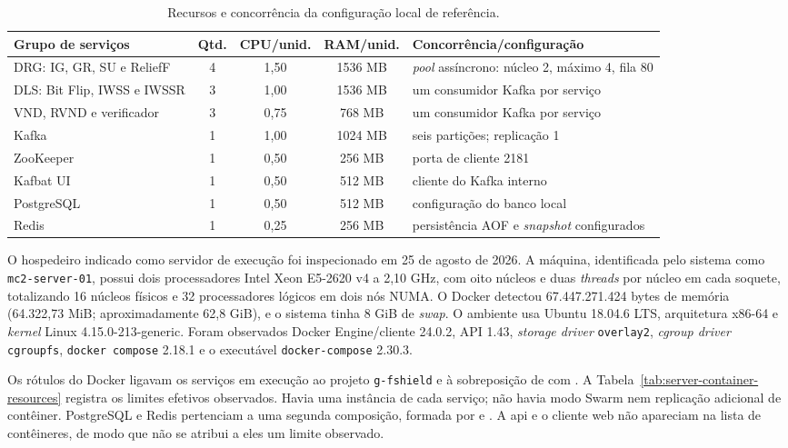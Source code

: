 \begin{table}[!htb]
  \centering
  \scriptsize
  \caption{Recursos e concorrência da configuração local de referência.}
  \label{tab:container-resources}
  \begin{tabularx}{\linewidth}{@{}Xc c c X@{}}
    \toprule
    \textbf{Grupo de serviços} & \textbf{Qtd.} & \textbf{CPU/unid.} & \textbf{RAM/unid.} & \textbf{Concorrência/configuração} \\
    \midrule
    DRG: IG, GR, SU e ReliefF & 4 & 1,50 & 1536 MB & \textit{pool} assíncrono: núcleo 2, máximo 4, fila 80 \\
    DLS: Bit Flip, IWSS e IWSSR & 3 & 1,00 & 1536 MB & um consumidor Kafka por serviço \\
    VND, RVND e verificador & 3 & 0,75 & 768 MB & um consumidor Kafka por serviço \\
    Kafka & 1 & 1,00 & 1024 MB & seis partições; replicação 1 \\
    ZooKeeper & 1 & 0,50 & 256 MB & porta de cliente 2181 \\
    Kafbat UI & 1 & 0,50 & 512 MB & cliente do Kafka interno \\
    PostgreSQL & 1 & 0,50 & 512 MB & configuração do banco local \\
    Redis & 1 & 0,25 & 256 MB & persistência AOF e \textit{snapshot} configurados \\
    \bottomrule
  \end{tabularx}
\end{table}

O hospedeiro indicado como servidor de execução foi inspecionado em 25 de agosto de 2026. A máquina, identificada pelo sistema como \texttt{mc2-server-01}, possui dois processadores Intel Xeon E5-2620 v4 a 2,10 GHz, com oito núcleos e duas \textit{threads} por núcleo em cada soquete, totalizando 16 núcleos físicos e 32 processadores lógicos em dois nós NUMA. O Docker detectou 67.447.271.424 bytes de memória (64.322,73 MiB; aproximadamente 62,8 GiB), e o sistema tinha 8 GiB de \textit{swap}. O ambiente usa Ubuntu 18.04.6 LTS, arquitetura x86-64 e \textit{kernel} Linux 4.15.0-213-generic. Foram observados Docker Engine/cliente 24.0.2, API 1.43, \textit{storage driver} \texttt{overlay2}, \textit{cgroup driver} \texttt{cgroupfs}, \texttt{docker compose} 2.18.1 e o executável \texttt{docker-compose} 2.30.3.

Os rótulos do Docker ligavam os serviços em execução ao projeto \texttt{g-fshield} e à sobreposição de  com . A Tabela~\ref{tab:server-container-resources} registra os limites efetivos observados. Havia uma instância de cada serviço; não havia modo Swarm nem replicação adicional de contêiner. PostgreSQL e Redis pertenciam a uma segunda composição, formada por  e . A \ac{api} e o cliente web não apareciam na lista de contêineres, de modo que não se atribui a eles um limite observado.

